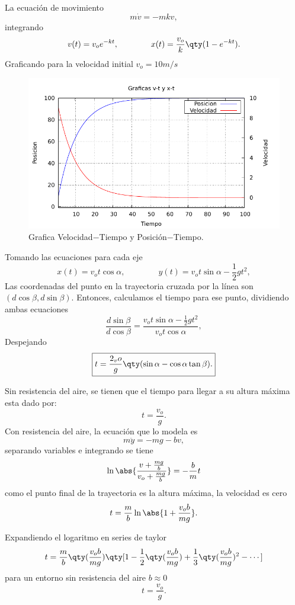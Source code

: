 \begin{mdframed}[style=warning]
	\begin{ejercicio}
		La ecuación de movimiento
			$$ m\dot{v} = -mkv, $$
		integrando
			$$ v(t) = v_o e^{-kt}, \qquad \qquad x(t) = \frac{v_o}{k} \qty(1 - e^{-kt}). $$
		Graficando para la velocidad initial $v_o = 10m/s$
		\begin{figure}[H]
			\centering
			\includegraphics[scale=1]{img/ej1-1.pdf}
			\caption{Grafica Velocidad$-$Tiempo y Posición$-$Tiempo.}
			\label{ej1-1}
		\end{figure}
	\end{ejercicio}
\end{mdframed}

\begin{mdframed}[style=warning]
	\begin{ejercicio}
		Tomando las ecuaciones para cada eje
			$$ x(t) = v_o t\cos{\alpha}, \qquad \qquad y(t) = v_o t \sin{\alpha} - \frac{1}{2} gt^2, $$
		Las coordenadas del punto en la trayectoria cruzada por la línea son $(d\cos{\beta},d\sin{\beta})$. Entonces, calculamos el tiempo para ese punto, dividiendo ambas ecuaciones
			$$ \frac{d\sin{\beta}}{d\cos{\beta}} = \frac{v_o t \sin{\alpha} - \frac{1}{2}gt^2}{v_o t\cos{\alpha}}, $$
		Despejando
			$$ \boxed{t = \frac{2_vo}{g} \qty(\sin{\alpha} - \cos{\alpha} \tan{\beta}).} $$
	\end{ejercicio}
\end{mdframed}

\begin{mdframed}[style=warning]
	\begin{ejercicio}
		Sin resistencia del aire, se tienen que el tiempo para llegar a su altura máxima esta dado por:
			$$ \boxed{t = \frac{v_o}{g}.} $$
		Con resistencia del aire, la ecuación que lo modela es
			$$ m\ddot{y} = -mg - bv, $$
		separando variables e integrando se tiene
			$$ \ln{\abs{\frac{v + \frac{mg}{b}}{v_o + \frac{mg}{b}}}} = -\frac{b}{m} t $$
		como el punto final de la trayectoria es la altura máxima, la velocidad es cero
			$$ t = \frac{m}{b} \ln{\abs{1 + \frac{v_o b}{mg}}}. $$
			
		Expandiendo el logaritmo en series de taylor
			$$ t = \frac{m}{b} \qty(\frac{v_o b}{mg}) \qty[1 - \frac{1}{2} \qty(\frac{v_o b}{mg}) + \frac{1}{3} \qty(\frac{v_o b}{mg})^2 - \cdots] $$
		para un entorno sin resistencia del aire $b \approx 0$
			$$ t = \frac{v_o}{g}. $$ 
	\end{ejercicio}
\end{mdframed}

